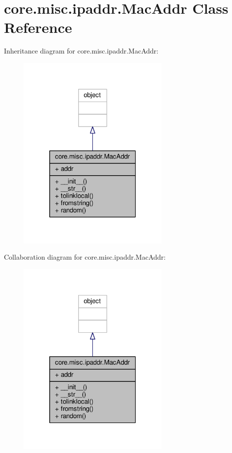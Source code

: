 \hypertarget{classcore_1_1misc_1_1ipaddr_1_1_mac_addr}{\section{core.\+misc.\+ipaddr.\+Mac\+Addr Class Reference}
\label{classcore_1_1misc_1_1ipaddr_1_1_mac_addr}
}


Inheritance diagram for core.\+misc.\+ipaddr.\+Mac\+Addr\+:
\nopagebreak
\begin{figure}[H]
\begin{center}
\leavevmode
\includegraphics[width=211pt]{classcore_1_1misc_1_1ipaddr_1_1_mac_addr__inherit__graph}
\end{center}
\end{figure}


Collaboration diagram for core.\+misc.\+ipaddr.\+Mac\+Addr\+:
\nopagebreak
\begin{figure}[H]
\begin{center}
\leavevmode
\includegraphics[width=211pt]{classcore_1_1misc_1_1ipaddr_1_1_mac_addr__coll__graph}
\end{center}
\end{figure}
